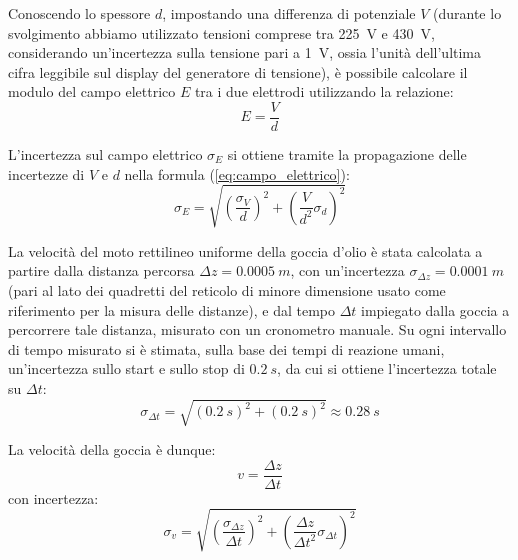 \documentclass[a4paper,12pt]{article}
\begin{document}
Conoscendo lo spessore \( d \), impostando una differenza di potenziale \( V \) (durante lo svolgimento abbiamo utilizzato tensioni comprese tra \SI{225}{V} e \SI{430}{V}, considerando un'incertezza sulla tensione pari a \SI{1}{V}, ossia l'unità dell'ultima cifra leggibile sul display del generatore di tensione), è possibile calcolare il modulo del campo elettrico \( E \) tra i due elettrodi utilizzando la relazione:
\begin{equation}
E= \frac{V}{d}
\label{eq:campo_elettrico}
\end{equation}

L'incertezza sul campo elettrico \( \sigma_E \) si ottiene tramite la propagazione delle incertezze di \( V \) e \( d \) nella formula (\ref{eq:campo_elettrico}):
\begin{equation}
\sigma_E= \sqrt{\left( \frac{\sigma_V}{d} \right)^2+ \left( \frac{V}{d^2} \sigma_d \right)^2}
\label{eq:incertezza_E}
\end{equation}

La velocità del moto rettilineo uniforme della goccia d’olio è stata calcolata a partire dalla distanza percorsa \( \Delta z = \SI{0.0005}{m} \), con un'incertezza \( \sigma_{\Delta z} = \SI{0.0001}{m} \) (pari al lato dei quadretti del reticolo di minore dimensione usato come riferimento per la misura delle distanze), e dal tempo \( \Delta t \) impiegato dalla goccia a percorrere tale distanza, misurato con un cronometro manuale. Su ogni intervallo di tempo misurato si è stimata, sulla base dei tempi di reazione umani, un'incertezza sullo start e sullo stop di \( \SI{0.2}{s} \), da cui si ottiene l'incertezza totale su \( \Delta t \):
\begin{equation}
\sigma_{\Delta t}= \sqrt{(\SI{0.2}{s})^2+ (\SI{0.2}{s})^2} \approx \SI{0.28}{s}
\label{eq:incertezza_tempo}
\end{equation}

La velocità della goccia è dunque:
\begin{equation}
v= \frac{\Delta z}{\Delta t}
\label{eq:velocita_goccia}
\end{equation}
con incertezza:
\begin{equation}
\sigma_v= \sqrt{\left( \frac{\sigma_{\Delta z}}{\Delta t} \right)^2+ \left( \frac{\Delta z}{\Delta t^2} \sigma_{\Delta t} \right)^2}
\label{eq:incertezza_velocita}
\end{equation}
\end{document}
